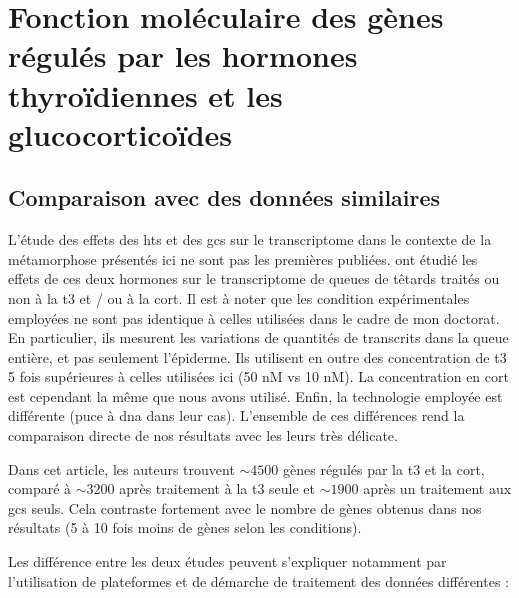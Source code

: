 \documentclass[../main.tex]{subfiles}
\begin{document}
\chapter{Fonction moléculaire des gènes régulés par les hormones thyroïdiennes et les glucocorticoïdes}


\section{Comparaison avec des données similaires}

L'étude des effets des \glspl{ht} et des \glspl{gc} sur le transcriptome dans le contexte de la métamorphose présentés ici ne sont pas les premières publiées.
\citet{Kulkarni2012} ont étudié les effets de ces deux hormones sur le transcriptome de queues de têtards traités ou non à la \gls{t3} et / ou à la \gls{cort}.
Il est à noter que les condition expérimentales employées ne sont pas identique à celles utilisées dans le cadre de mon doctorat.
En particulier, ils mesurent les variations de quantités de transcrits dans la queue entière, et pas seulement l'épiderme.
Ils utilisent en outre des concentration de \gls{t3} 5 fois supérieures à celles utilisées ici (50 nM vs 10 nM).
La concentration en \gls{cort} est cependant la même que nous avons utilisé.
Enfin, la technologie employée est différente (puce à \gls{dna} dans leur cas).
L'ensemble de ces différences rend la comparaison directe de nos résultats avec les leurs très délicate.
\par
Dans cet article, les auteurs trouvent $\sim 4500$ gènes régulés par la \gls{t3} et la \gls{cort}, comparé à $\sim 3200$ après traitement à la \gls{t3} seule et $\sim 1900$ après un traitement aux \glspl{gc} seuls.
Cela contraste fortement avec le nombre de gènes obtenus dans nos résultats (5 à 10 fois moins de gènes selon les conditions).
\par
Les différence entre les deux études peuvent s'expliquer notamment par l'utilisation de plateformes et de démarche de traitement des données différentes :
\end{document}
